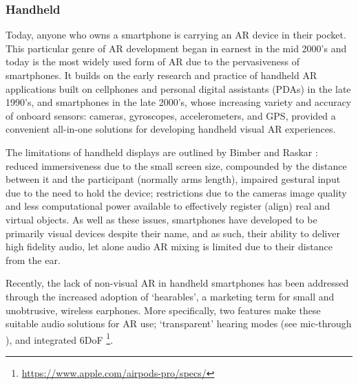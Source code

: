 \subsubsection{Handheld}\label{sec: literature-interface-forms-mobile}
Today, anyone who owns a smartphone is carrying an AR device in their pocket. This particular genre of AR development began in earnest in the mid 2000's and today is the most widely used form of AR due to the pervasiveness of smartphones. It builds on the early research and practice of handheld AR applications built on cellphones and personal digital assistants (PDAs) in the late 1990's, and smartphones in the late 2000’s, whose increasing variety and accuracy of onboard sensors: cameras, gyroscopes, accelerometers, and GPS, provided a convenient all-in-one solutions for developing handheld visual AR experiences. 

The limitations of handheld displays are outlined by Bimber and Raskar \citeyearpar[pp. 79-83]{bimber2005}: reduced immersiveness due to the small screen size, compounded by the distance between it and the participant (normally arms length), impaired gestural input due to the need to hold the device; restrictions due to the cameras image quality and less computational power available to effectively register (align) real and virtual objects. As well as these issues, smartphones have developed to be primarily visual devices despite their name, and as such, their ability to deliver high fidelity audio, let alone audio AR mixing is limited due to their distance from the ear. 

Recently, the lack of non-visual AR in handheld smartphones has been addressed through the increased adoption of `hearables', a marketing term for small and unobtrusive, wireless earphones. More specifically, two features make these suitable audio solutions for AR use; `transparent' hearing modes (see mic-through \citep{lindeman2008}), and integrated 6DoF \footnote{\url{https://www.apple.com/airpods-pro/specs/}}.

